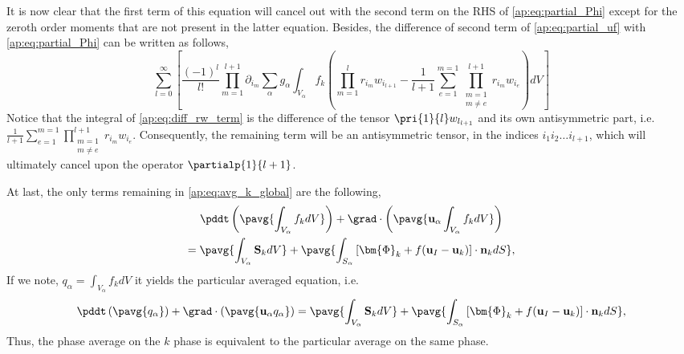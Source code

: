 It is now clear that the first term of this equation will cancel out with the second term on the RHS of \ref{ap:eq:partial_Phi} except for the zeroth order moments that are not present in the latter equation.
Besides, the difference of second term of \ref{ap:eq:partial_uf} with \ref{ap:eq:partial_Phi} can be written as follows, 
\begin{equation}    
    \sum_{l=0}^\infty  
    \left[
        \frac{(-1)^l}{l!} \prod^{l+1}_{m=1}\partial_{i_m}
        \sum_\alpha  g_\alpha 
        \int_{V_\alpha} f_k\left(
            \prod^l_{m=1}r_{i_m} w_{i_{l+1}} 
            -
            \frac{1}{l+1}
            \sum_{e=1}^{m=1} 
            \prod^{l+1}_{\substack{m=1\\ m\neq e}} 
            r_{i_m} 
            w_{i_e}
        \right)
        dV
    \right]
    \label{ap:eq:diff_rw_term}
\end{equation}
Notice that the integral of \ref{ap:eq:diff_rw_term} is the difference of the tensor $\pri{1}{l}w_{l_{l+1}}$ and its own antisymmetric part, i.e. $\frac{1}{l+1} \sum_{e=1}^{m=1} \prod^{l+1}_{\substack{m=1\\ m\neq e}} r_{i_m} w_{i_e}$.
Consequently, the remaining term will be an antisymmetric tensor, in the indices $i_1i_2\ldots i_{l+1}$, which will ultimately cancel upon the operator $\partialp{1}{l+1}$.

At last, the only terms remaining in \ref{ap:eq:avg_k_global} are the following,
\begin{multline*}
    \pddt   \left(\pavg{\int_{V_\alpha} f_k dV}\right)
    + \grad \cdot \left(\pavg{\textbf{u}_\alpha \int_{V_\alpha} f_k  dV  }\right)\\
    = \pavg{\int_{V_\alpha} \textbf{S}_k dV }
    + \pavg{\int_{S_\alpha} \left[\bm{\Phi}_k 
    + f (\textbf{u}_I-\textbf{u}_k) \right] \cdot \textbf{n}_k d S},
\end{multline*}
If we note, $q_\alpha = \int_{V_\alpha} f_k dV$ it yields the particular averaged equation, i.e. 
\begin{equation}
    \pddt   \left(\pavg{q_\alpha}\right)
    + \grad \cdot \left(\pavg{\textbf{u}_\alpha q_\alpha  }\right)
    = \pavg{\int_{V_\alpha} \textbf{S}_k dV }
    + \pavg{\int_{S_\alpha} \left[\bm{\Phi}_k 
    + f (\textbf{u}_I-\textbf{u}_k) \right] \cdot \textbf{n}_k d S},
\end{equation}
Thus, the phase average on the $k$ phase is equivalent to the particular average on the same phase. 




